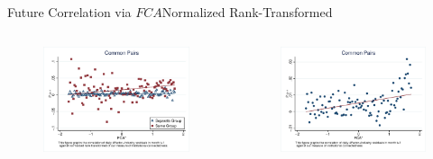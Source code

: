 \documentclass{beamer}
\begin{document}
	\begin{frame}{Future Correlation via $ FCA $}{Normalized Rank-Transformed}
		\label{Monthly16} 
		\begin{columns}
			\begin{figure}   
				\centering
				\includegraphics[width=\linewidth]{"mcorr5bg.eps"}     \end{figure}            
			\begin{figure}
				\centering  
				\includegraphics[width=\linewidth]{"mcorr5l.eps"}
			\end{figure}
		\end{columns}
		
		
	\end{frame}
	
\end{document}
